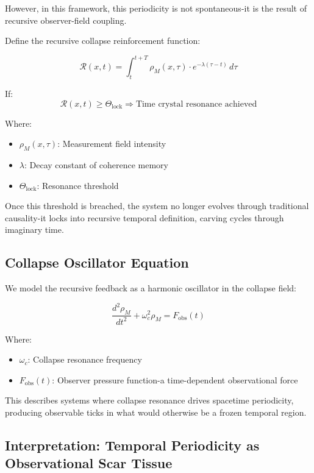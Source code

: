 However, in this framework, this periodicity is not spontaneous-it is the result of recursive observer-field coupling.

Define the recursive collapse reinforcement function:

\begin{equation}
\mathcal{R}(x,t) = \int_{t}^{t + T} \rho_M(x,\tau) \cdot e^{-\lambda (\tau - t)} \, d\tau
\end{equation}

If:
\[
\mathcal{R}(x,t) \geq \Theta_{\text{lock}} \Rightarrow \text{Time crystal resonance achieved}
\]

Where:
\begin{itemize}
    \item \( \rho_M(x,\tau) \): Measurement field intensity
    \item \( \lambda \): Decay constant of coherence memory
    \item \( \Theta_{\text{lock}} \): Resonance threshold
\end{itemize}

Once this threshold is breached, the system no longer evolves through traditional causality-it locks into recursive temporal definition, carving cycles through imaginary time.

\subsection{Collapse Oscillator Equation}

We model the recursive feedback as a harmonic oscillator in the collapse field:

\begin{equation}
\frac{d^2 \rho_M}{dt^2} + \omega_c^2 \rho_M = F_{\text{obs}}(t)
\end{equation}

Where:
\begin{itemize}
    \item \( \omega_c \): Collapse resonance frequency
    \item \( F_{\text{obs}}(t) \): Observer pressure function-a time-dependent observational force
\end{itemize}

This describes systems where collapse resonance drives spacetime periodicity, producing observable ticks in what would otherwise be a frozen temporal region.

\subsection{Interpretation: Temporal Periodicity as Observational Scar Tissue}

